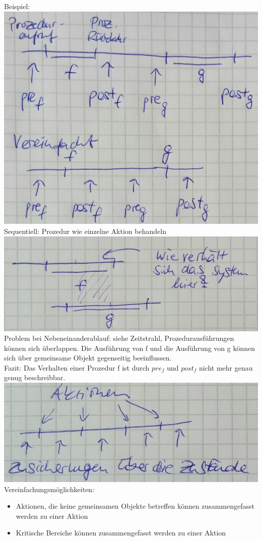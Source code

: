 Beispiel:\\
\includegraphics[width=.4\textwidth]{Verifikation_Zeitstrahl.jpeg}\\
Sequentiell: Prozedur wie einzelne Aktion behandeln\\
\includegraphics[width=.4\textwidth]{Verifikation_Zeitstrahl2.jpeg}\\
Problem bei Nebeneinanderablauf: siehe Zeitstrahl, Prozedurausführungen können sich überlappen. Die Ausführung von f und die Ausführung von g können sich über gemeinsame Objekt gegenseitig beeinflussen.\\
Fazit: Das Verhalten einer Prozedur f ist durch $pre_f$ und $post_f$ nicht mehr genau genug beschreibbar.\\
\includegraphics[width=.4\textwidth]{Verifikation_Zeitstrahl3.jpeg}\\
Vereinfachungsmöglichkeiten:\\
\begin{itemize}
\item Aktionen, die keine gemeinsamen Objekte betreffen können zusammengefasst werden zu einer Aktion
\item Kritische Bereiche können zusammengefasst werden zu einer Aktion
\end{itemize}

